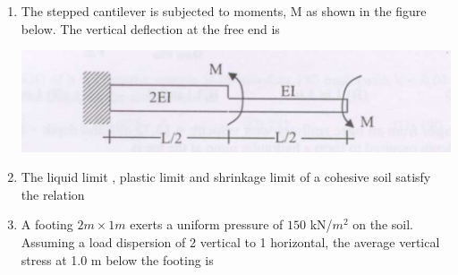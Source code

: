 \documentclass[journal]{IEEEtran}
\begin{document}
\begin{enumerate}
\item The stepped cantilever is subjected to moments, M as shown in the figure below. The vertical deflection at the free end  is \hfill {}

\includegraphics[width=\columnwidth]{figs/fig3.png} 
\begin{enumerate}
\end{enumerate}

\item The liquid limit , plastic limit  and shrinkage limit  of a cohesive soil satisfy the relation \hfill {}

\begin{enumerate}
\end{enumerate}

\item A footing $2 m \times 1 m$ exerts a uniform pressure of $150$ kN/$m^{2}$ on the soil. Assuming a load
dispersion of 2 vertical to 1 horizontal, the average vertical stress  at 1.0 m below the
footing is \hfill {}

\begin{enumerate}
\end{enumerate}


\end{enumerate}
\end{document}
